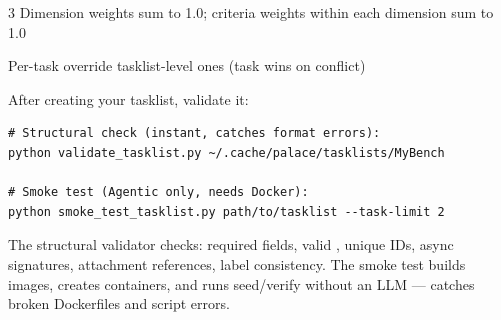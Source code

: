 \documentclass[10pt,landscape]{article}
\begin{document}
\begin{multicols}{3}
\bull Dimension weights sum to 1.0; criteria weights within each dimension sum to 1.0

\bull Per-task  override tasklist-level ones (task wins on conflict)


After creating your tasklist, validate it:

\begin{lstlisting}
# Structural check (instant, catches format errors):
python validate_tasklist.py ~/.cache/palace/tasklists/MyBench

# Smoke test (Agentic only, needs Docker):
python smoke_test_tasklist.py path/to/tasklist --task-limit 2
\end{lstlisting}

The structural validator checks: required fields, valid , unique IDs, async signatures, attachment references, label consistency. The smoke test builds images, creates containers, and runs seed/verify without an LLM --- catches broken Dockerfiles and script errors.

\end{multicols}
\end{document}
